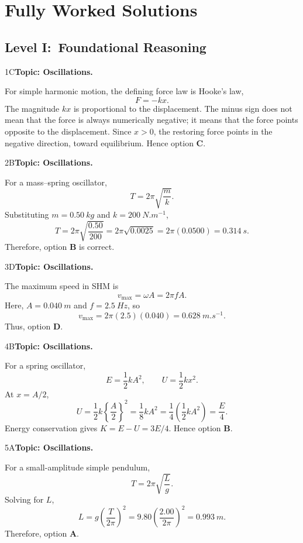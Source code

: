\documentclass[10pt,a4paper]{physicsquiz}
\begin{document}
\section{Fully Worked Solutions}
\subsection{Level I:\ Foundational Reasoning}
\begin{workedsolution}{1}{C}\textbf{Topic: Oscillations.}\par For simple harmonic motion, the defining force law is Hooke's law,
  \[
    F=-kx.
  \]
  The magnitude \(kx\) is proportional to the displacement. The minus sign does not mean that the force is always numerically negative; it means that the force points opposite to the displacement. Since \(x>0\), the restoring force points in the negative direction, toward equilibrium. Hence option \textbf{C}.\end{workedsolution}
\begin{workedsolution}{2}{B}\textbf{Topic: Oscillations.}\par For a mass{--}spring oscillator,
  \[
    T=2\pi\sqrt{\frac{m}{k}}.
  \]
  Substituting \(m=\SI{0.50}{kg}\) and \(k=\SI{200}{N.m^{-1}}\),
  \[
    T=2\pi\sqrt{\frac{0.50}{200}}
    =2\pi\sqrt{0.0025}
    =2\pi(0.0500)
    =\SI{0.314}{s}.
  \]
  Therefore, option \textbf{B} is correct.\end{workedsolution}
\begin{workedsolution}{3}{D}\textbf{Topic: Oscillations.}\par The maximum speed in SHM is
  \[
    v_{\max}=\omega A=2\pi fA.
  \]
  Here, \(A=\SI{0.040}{m}\) and \(f=\SI{2.5}{Hz}\), so
  \[
    v_{\max}=2\pi(2.5)(0.040)=\SI{0.628}{m.s^{-1}}.
  \]
  Thus, option \textbf{D}.\end{workedsolution}
\begin{workedsolution}{4}{B}\textbf{Topic: Oscillations.}\par For a spring oscillator,
  \[
    E=\frac12 kA^2,\qquad U=\frac12 kx^2.
  \]
  At \(x=A/2\),
  \[
    U=\frac12 k{\left\{\frac{A}{2}\right\}}^2
    =\frac18 kA^2
    =\frac14\left(\frac12 kA^2\right)
    =\frac{E}{4}.
  \]
  Energy conservation gives \(K=E-U=3E/4\). Hence option \textbf{B}.\end{workedsolution}
\begin{workedsolution}{5}{A}\textbf{Topic: Oscillations.}\par For a small-amplitude simple pendulum,
  \[
    T=2\pi\sqrt{\frac{L}{g}}.
  \]
  Solving for \(L\),
  \[
    L=g{\left(\frac{T}{2\pi}\right)}^2
    =9.80{\left(\frac{2.00}{2\pi}\right)}^2
    =\SI{0.993}{m}.
  \]
  Therefore, option \textbf{A}.\end{workedsolution}
\end{document}
